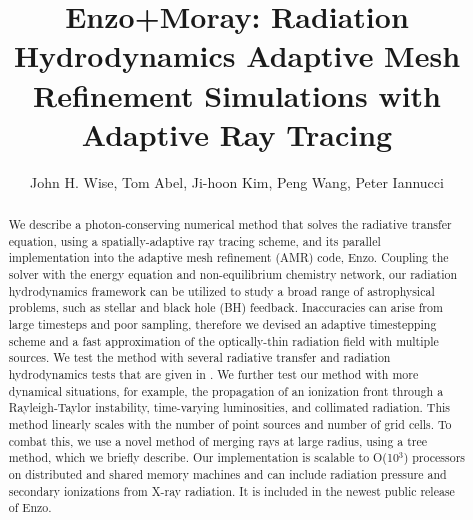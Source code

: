 \documentclass[12pt,preprint]{aastex}
\begin{document}

\title{Enzo+Moray: Radiation Hydrodynamics Adaptive Mesh Refinement
  Simulations with Adaptive Ray Tracing} 

\author{John H. Wise, 
  Tom Abel, 
  Ji-hoon Kim, 
  Peng Wang,
  Peter Iannucci}


\begin{abstract}

  We describe a photon-conserving numerical method that solves the
  radiative transfer equation, using a spatially-adaptive ray tracing
  scheme, and its parallel implementation into the adaptive mesh
  refinement (AMR) code, Enzo.  Coupling the solver with the energy
  equation and non-equilibrium chemistry network, our radiation
  hydrodynamics framework can be utilized to study a broad range of
  astrophysical problems, such as stellar and black hole (BH)
  feedback.  Inaccuracies can arise from large timesteps and poor
  sampling, therefore we devised an adaptive timestepping scheme and a
  fast approximation of the optically-thin radiation field with
  multiple sources.  We test the method with several radiative
  transfer and radiation hydrodynamics tests that are given in
  \citet{RT06, Iliev09}.  We further test our method with more
  dynamical situations, for example, the propagation of an ionization
  front through a Rayleigh-Taylor instability, time-varying
  luminosities, and collimated radiation.  This method linearly scales
  with the number of point sources and number of grid cells.  To
  combat this, we use a novel method of merging rays at large radius,
  using a tree method, which we briefly describe.  Our implementation
  is scalable to O(10$^3$) processors on distributed and shared memory
  machines and can include radiation pressure and secondary
  ionizations from X-ray radiation.  It is included in the newest
  public release of Enzo.
  
\end{abstract}
\end{document}
